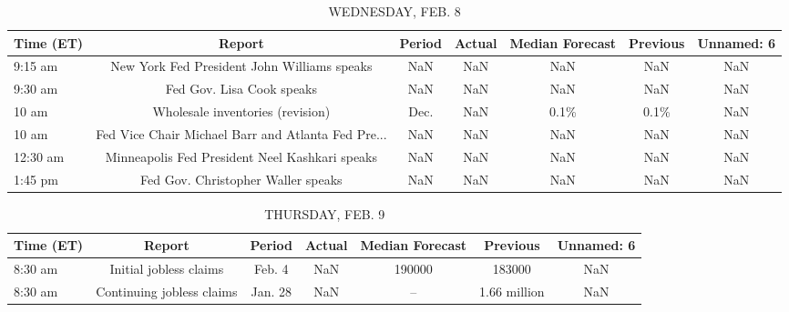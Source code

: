 \documentclass{article}%
\begin{document}
\begin{table}[htbp]%
\caption{WEDNESDAY, FEB. 8}%
\centering%
\begin{adjustbox}{width=1\textwidth}%
\begin{tabular}{lcccccc}
\toprule
Time (ET) &                                             Report & Period & Actual & Median Forecast & Previous & Unnamed: 6 \\
\midrule
  9:15 am &        New York Fed President John Williams speaks &    NaN &    NaN &             NaN &      NaN &        NaN \\
  9:30 am &                          Fed Gov. Lisa Cook speaks &    NaN &    NaN &             NaN &      NaN &        NaN \\
    10 am &                   Wholesale inventories (revision) &   Dec. &    NaN &            0.1\% &     0.1\% &        NaN \\
    10 am & Fed Vice Chair Michael Barr and Atlanta Fed Pre... &    NaN &    NaN &             NaN &      NaN &        NaN \\
 12:30 am &     Minneapolis Fed President Neel Kashkari speaks &    NaN &    NaN &             NaN &      NaN &        NaN \\
  1:45 pm &                 Fed Gov. Christopher Waller speaks &    NaN &    NaN &             NaN &      NaN &        NaN \\
\bottomrule
\end{tabular}
%
\end{adjustbox}%
\end{table}

%


\begin{table}[htbp]%
\caption{THURSDAY, FEB. 9}%
\centering%
\begin{adjustbox}{width=1\textwidth}%
\begin{tabular}{lcccccc}
\toprule
Time (ET) &                    Report &  Period & Actual & Median Forecast &     Previous & Unnamed: 6 \\
\midrule
  8:30 am &    Initial jobless claims &  Feb. 4 &    NaN &          190000 &       183000 &        NaN \\
  8:30 am & Continuing jobless claims & Jan. 28 &    NaN &              -- & 1.66 million &        NaN \\
\bottomrule
\end{tabular}
%
\end{adjustbox}%
\end{table}
\end{document}
